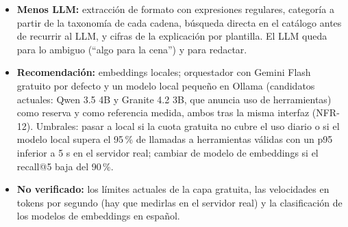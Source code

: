 \begin{tcolorbox}[colback=responsecolor, title=Insights de Claude, colframe=gray!60!black, breakable]
\begin{itemize}
		\item \textbf{Menos LLM:} extracción de formato con expresiones regulares, categoría a partir de la taxonomía de cada cadena, búsqueda directa en el catálogo antes de recurrir al LLM, y cifras de la explicación por plantilla. El LLM queda para lo ambiguo (``algo para la cena'') y para redactar.

		\item \textbf{Recomendación:} embeddings locales; orquestador con Gemini Flash gratuito por defecto y un modelo local pequeño en Ollama (candidatos actuales: Qwen 3.5 4B y Granite 4.2 3B, que anuncia uso de herramientas) como reserva y como referencia medida, ambos tras la misma interfaz (NFR-12). Umbrales: pasar a local si la cuota gratuita no cubre el uso diario o si el modelo local supera el 95\,\% de llamadas a herramientas válidas con un p95 inferior a 5 s en el servidor real; cambiar de modelo de embeddings si el recall@5 baja del 90\,\%.

		\item \textbf{No verificado:} los límites actuales de la capa gratuita, las velocidades en tokens por segundo (hay que medirlas en el servidor real) y la clasificación de los modelos de embeddings en español.
	\end{itemize}
\end{tcolorbox}

